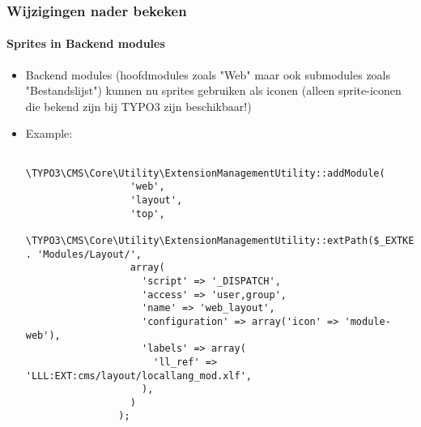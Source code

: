 \begin{frame}[fragile]
	\frametitle{Wijzigingen nader bekeken}
	\framesubtitle{Sprites in Backend modules}

	\lstset{basicstyle=\tiny\ttfamily}

	\begin{itemize}

		\item Backend modules (hoofdmodules zoals "Web" maar ook submodules zoals
			"Bestandslijst") kunnen nu sprites gebruiken als iconen\newline
			\small
				(alleen sprite-iconen die bekend zijn bij TYPO3 zijn beschikbaar!)
			\normalsize

		\item Example:

			\begin{lstlisting}
				\TYPO3\CMS\Core\Utility\ExtensionManagementUtility::addModule(
				  'web',
				  'layout',
				  'top',
				  \TYPO3\CMS\Core\Utility\ExtensionManagementUtility::extPath($_EXTKEY) . 'Modules/Layout/',
				  array(
				    'script' => '_DISPATCH',
				    'access' => 'user,group',
				    'name' => 'web_layout',
				    'configuration' => array('icon' => 'module-web'),
				    'labels' => array(
				      'll_ref' => 'LLL:EXT:cms/layout/locallang_mod.xlf',
				    ),
				  )
				);
			\end{lstlisting}

	\end{itemize}

\end{frame}


